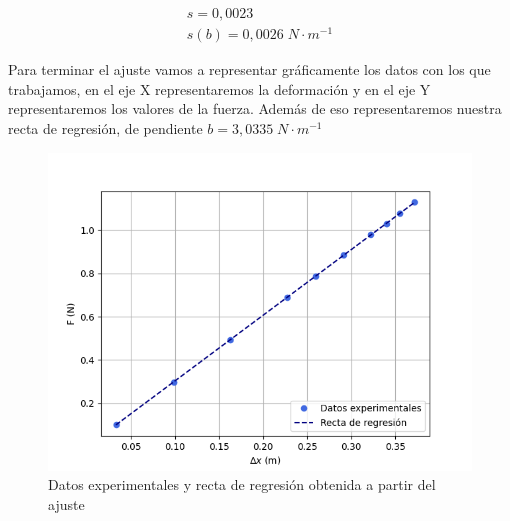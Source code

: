 \documentclass[a4paper,12pt,titlepage]{article}
\begin{document}
\begin{equation}
    \begin{gathered}
        s = 0,0023 \\
        s(b) = 0,0026 \; N\cdot m^{-1}
    \end{gathered}
\end{equation}

Para terminar el ajuste vamos a representar gráficamente los datos con los que trabajamos, en el eje X representaremos la deformación y en el eje Y representaremos los valores de la fuerza. Además de eso representaremos nuestra recta de regresión, de pendiente $b=3,0335\; N\cdot m^{-1}$

\begin{figure}[h!]
    \centering
    \includegraphics[width=0.75\linewidth]{Images/RegEstatico.png}
    \caption{Datos experimentales y recta de regresión obtenida a partir del ajuste}
\end{figure}
\end{document}
